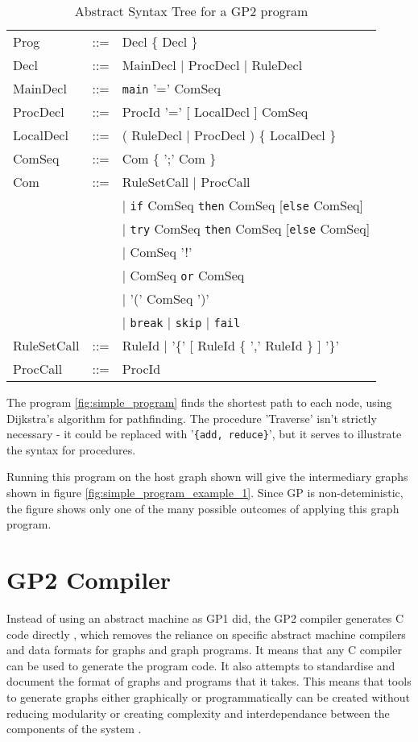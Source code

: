 \documentclass{UoYCSproject}
\begin{document}
\begin{table}
\begin{tabular}{l l l}
Prog        & ::= & Decl \{ Decl \} \\
Decl        & ::= & MainDecl | ProcDecl | RuleDecl \\
MainDecl    & ::= & \texttt{main} '=' ComSeq \\
ProcDecl    & ::= & ProcId '=' [ LocalDecl ] ComSeq \\
LocalDecl   & ::= & ( RuleDecl | ProcDecl ) \{ LocalDecl \} \\
ComSeq      & ::= & Com \{ ';' Com \} \\
Com         & ::= & RuleSetCall | ProcCall \\
            &     & | \texttt{if} ComSeq \texttt{then} ComSeq [\texttt{else} ComSeq] \\
            &     & | \texttt{try} ComSeq \texttt{then} ComSeq [\texttt{else} ComSeq] \\
            &     & | ComSeq '!' \\
            &     & | ComSeq \texttt{or} ComSeq \\
            &     & | '(' ComSeq ')' \\
            &     & | \texttt{break} | \texttt{skip} | \texttt{fail} \\
RuleSetCall & ::= & RuleId | '\{' [ RuleId \{ ',' RuleId \} ] '\}' \\
ProcCall    & ::= & ProcId \\
\end{tabular}
\caption{Abstract Syntax Tree for a GP2 program}
\label{table:gp2_ast}
\end{table}



The program \ref{fig:simple_program} finds the shortest path to each node, using Dijkstra's algorithm for pathfinding. The procedure 'Traverse' isn't strictly necessary - it could be replaced with '\texttt{\{add, reduce\}}', but it serves to illustrate the syntax for procedures. 

Running this program on the host graph shown will give the intermediary graphs shown in figure \ref{fig:simple_program_example_1}. Since GP is non-deteministic, the figure shows only one of the many possible outcomes of applying this graph program.



\section{GP2 Compiler}
Instead of using an abstract machine as GP1 did, the GP2 compiler generates C code directly \cite{chris_compiler}, which removes the reliance on specific abstract machine compilers and data formats for graphs and graph programs. It means that any C compiler can be used to generate the program code. It also attempts to standardise and document the format of graphs and programs that it takes. This means that tools to generate graphs either graphically or programmatically can be created without reducing modularity or creating complexity and interdependance between the components of the system \cite{gp2_ide}.
\end{document}

